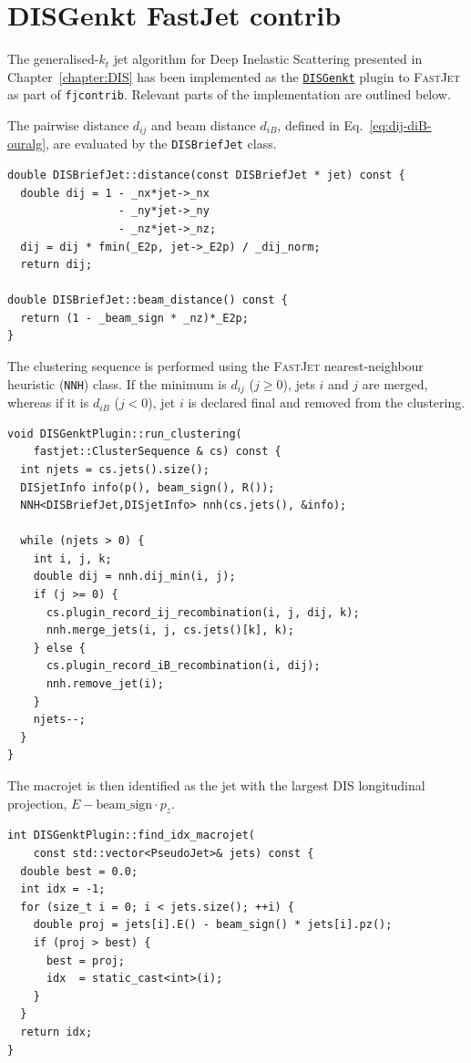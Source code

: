 \chapter{DISGenkt FastJet contrib}
\label{ap:DIS-fastjet}

The generalised-$k_t$ jet algorithm for Deep Inelastic Scattering presented in
Chapter~\ref{chapter:DIS} has been implemented as the
\href{https://repo.hepforge.org/source/fastjetsvn/browse/contrib/contribs/DISGenkt}{\texttt{DISGenkt}}
plugin to \textsc{FastJet} as part of \texttt{fjcontrib}. Relevant parts of the implementation are outlined below.

The pairwise distance $d_{ij}$ and beam distance $d_{iB}$,
defined in Eq.~\eqref{eq:dij-diB-ouralg}, are evaluated by the
\texttt{DISBriefJet} class. 
\begin{lstlisting}[caption={Implementation of the pairwise distance and 
beam distance. }]
double DISBriefJet::distance(const DISBriefJet * jet) const {
  double dij = 1 - _nx*jet->_nx
                 - _ny*jet->_ny
                 - _nz*jet->_nz;
  dij = dij * fmin(_E2p, jet->_E2p) / _dij_norm;
  return dij;
  
double DISBriefJet::beam_distance() const {
  return (1 - _beam_sign * _nz)*_E2p;  
}
\end{lstlisting}
The clustering sequence is performed using the \textsc{FastJet}
nearest-neighbour heuristic (\texttt{NNH}) class. If the minimum is $d_{ij}$ ($j\geq0$),
 jets $i$ and $j$ are merged, whereas if it is $d_{iB}$ ($j<0$), jet $i$ is declared
final and removed from the clustering.
\begin{lstlisting}[caption={Main clustering loop.}]
void DISGenktPlugin::run_clustering(
    fastjet::ClusterSequence & cs) const {
  int njets = cs.jets().size();
  DISjetInfo info(p(), beam_sign(), R());
  NNH<DISBriefJet,DISjetInfo> nnh(cs.jets(), &info);

  while (njets > 0) {
    int i, j, k;
    double dij = nnh.dij_min(i, j);
    if (j >= 0) {
      cs.plugin_record_ij_recombination(i, j, dij, k);
      nnh.merge_jets(i, j, cs.jets()[k], k);
    } else {
      cs.plugin_record_iB_recombination(i, dij);
      nnh.remove_jet(i);
    }
    njets--;
  }
}
\end{lstlisting}
The macrojet is then identified as the
jet with the largest DIS longitudinal projection,
$E-\mathrm{beam\_sign}\cdot p_z$.
\begin{lstlisting}[caption={Identification of the macrojet.}]
int DISGenktPlugin::find_idx_macrojet(
    const std::vector<PseudoJet>& jets) const {
  double best = 0.0;
  int idx = -1;
  for (size_t i = 0; i < jets.size(); ++i) {
    double proj = jets[i].E() - beam_sign() * jets[i].pz();
    if (proj > best) {
      best = proj;
      idx  = static_cast<int>(i);
    }
  }
  return idx;
}
\end{lstlisting}
